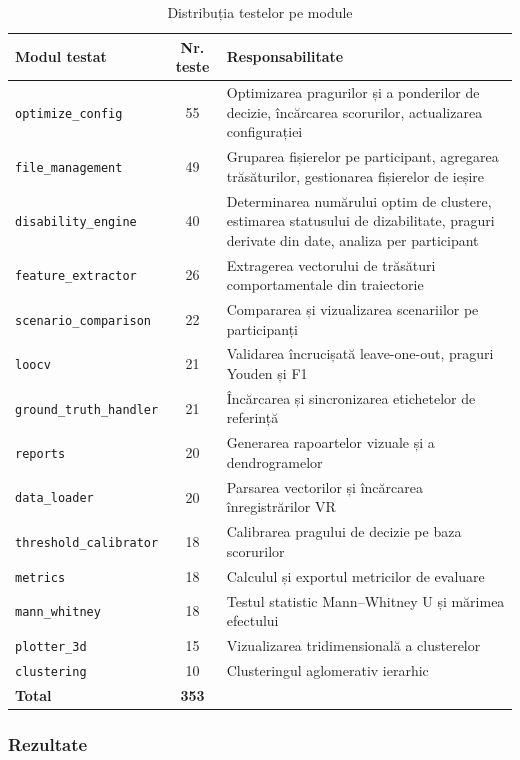 \documentclass[12pt,a4paper]{report}
\theoremstyle{definition}
\theoremstyle{remark}
\begin{document}
\begin{table}[ht]
\centering
\caption{Distribuția testelor pe module}
\label{tab:teste}
\small
\begin{tabular}{l c p{6.5cm}}
\hline
\textbf{Modul testat} & \textbf{Nr. teste} & \textbf{Responsabilitate} \\
\hline
\texttt{optimize\_config}     & 55 & Optimizarea pragurilor și a ponderilor de decizie, încărcarea scorurilor, actualizarea configurației \\
\texttt{file\_management}     & 49 & Gruparea fișierelor pe participant, agregarea trăsăturilor, gestionarea fișierelor de ieșire \\
\texttt{disability\_engine}   & 40 & Determinarea numărului optim de clustere, estimarea statusului de dizabilitate, praguri derivate din date, analiza per participant \\
\texttt{feature\_extractor}   & 26 & Extragerea vectorului de trăsături comportamentale din traiectorie \\
\texttt{scenario\_comparison} & 22 & Compararea și vizualizarea scenariilor pe participanți \\
\texttt{loocv}                & 21 & Validarea încrucișată leave-one-out, praguri Youden și F1 \\
\texttt{ground\_truth\_handler} & 21 & Încărcarea și sincronizarea etichetelor de referință \\
\texttt{reports}              & 20 & Generarea rapoartelor vizuale și a dendrogramelor \\
\texttt{data\_loader}         & 20 & Parsarea vectorilor și încărcarea înregistrărilor VR \\
\texttt{threshold\_calibrator}& 18 & Calibrarea pragului de decizie pe baza scorurilor \\
\texttt{metrics}              & 18 & Calculul și exportul metricilor de evaluare \\
\texttt{mann\_whitney}        & 18 & Testul statistic Mann--Whitney U și mărimea efectului \\
\texttt{plotter\_3d}          & 15 & Vizualizarea tridimensională a clusterelor \\
\texttt{clustering}           & 10 & Clusteringul aglomerativ ierarhic \\
\hline
\textbf{Total}                & \textbf{353} & \\
\hline
\end{tabular}
\end{table}

\subsubsection{Rezultate}
\end{document}
